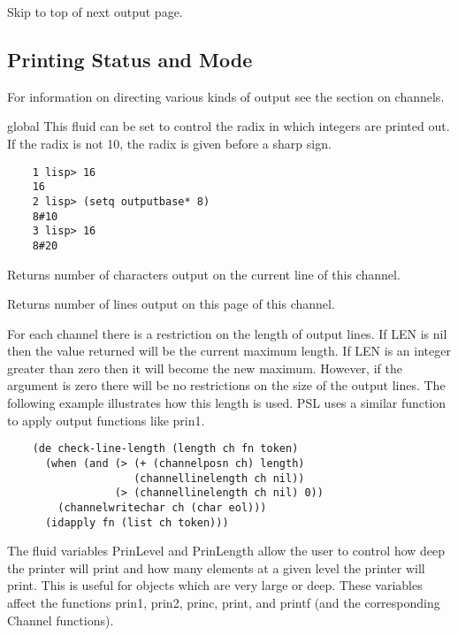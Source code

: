{}
{    Skip to top of next output page.
}

\subsection{Printing Status and Mode}

  For  information  on directing various kinds of output see the
section on channels.

 {global}
{    This fluid can be set to control the radix in which integers
    are printed out.  If the radix is not 10, the radix is given
    before a sharp sign.  }
\begin{verbatim}
    1 lisp> 16
    16
    2 lisp> (setq outputbase* 8)
    8#10
    3 lisp> 16
    8#20
\end{verbatim}
{}

{    Returns number of characters output on the current  line  of
    this channel.
}

{}

{    Returns number of lines output on this page of this channel.  }

{}

{   For  each  channel  there  is a restriction on the length of
    output lines.  If LEN is nil then the value returned will be
    the current maximum length.  If LEN is  an  integer  greater
    than  zero then it will become the new maximum.  However, if
    the argument is zero there will be no  restrictions  on  the
    size of the output lines.  The following example illustrates
    how  this  length  is  used.  PSL uses a similar function to
    apply output functions like prin1.}
\begin{verbatim}
    (de check-line-length (length ch fn token)
      (when (and (> (+ (channelposn ch) length)
                    (channellinelength ch nil))
                 (> (channellinelength ch nil) 0))
        (channelwritechar ch (char eol)))
      (idapply fn (list ch token)))
\end{verbatim}
The fluid variables PrinLevel and PrinLength allow the user to
control how deep the printer will print and how many elements at
a given level the printer  will  print.    This  is  useful  for
objects  which  are  very large or deep.  These variables affect
the functions prin1, prin2, princ, print, and  printf  (and  the
corresponding Channel functions).

